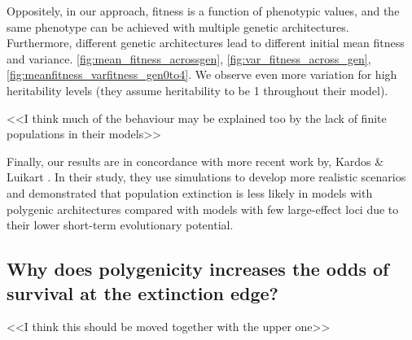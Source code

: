 \documentclass{article}
\begin{document}
Oppositely, in our approach, fitness is a function of phenotypic values, and the same phenotype can be achieved with multiple genetic architectures. Furthermore, different genetic architectures lead to different initial mean fitness and variance.  \ref{fig:mean_fitness_acrossgen}, \ref{fig:var_fitness_across_gen},  \ref{fig:meanfitness_varfitness_gen0to4}. We observe even more variation for high heritability levels (they assume heritability to be 1 throughout their model). 

<<I think much of the behaviour may be explained too by the lack of finite populations in their models>>

Finally, our results are in concordance with more recent work by, Kardos \& Luikart  \citep{Kardos2021-jd}. In their study,  they use simulations to develop more realistic scenarios and demonstrated that population extinction is less likely in models with polygenic architectures compared with models with few large-effect loci due to their lower short-term evolutionary potential.

\subsection{Why does polygenicity increases the odds of survival at the extinction edge?}

<<I think this should be moved together with the upper one>>
\end{document}
